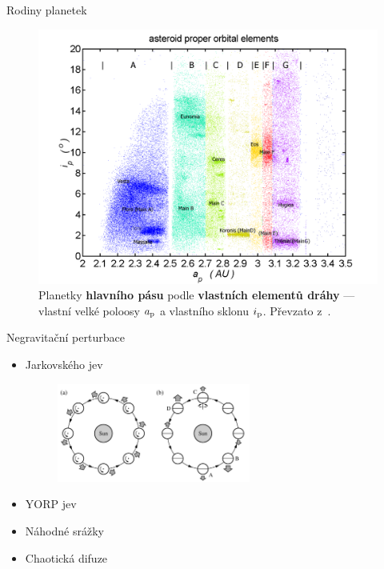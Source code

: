 \documentclass[xcolor=dvipsnames]{beamer}
\begin{document}
\begin{frame}[t]{\secname}{Rodiny planetek}
	\begin{figure}
		\centering
		\includegraphics[height=0.65\textheight,width=\textwidth,keepaspectratio]{../obr/mainbelt.png}
		\caption{\footnotesize{Planetky \textbf{hlavního pásu} podle \textbf{vlastních elementů dráhy} --- vlastní velké poloosy $a_{\rm p}$ a vlastního sklonu $i_{\rm p}$. Převzato z~\cite{wiki:belt}.}}
	\end{figure}
\end{frame}

\begin{frame}[t]{\secname}{Negravitační perturbace}
\begin{itemize}
\item Jarkovského jev

\begin{figure}
\centering
\includegraphics[width=0.6\textwidth]{../obr/jarkovskeho_jev.png}
\end{figure}

\item YORP jev
\item Náhodné srážky
\item Chaotická difuze
\end{itemize}

\end{frame}
\end{document}
